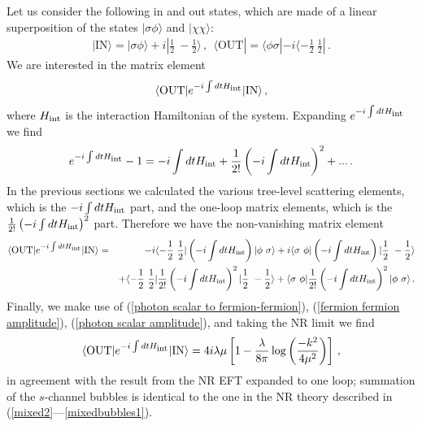 \documentclass[11pt]{article}
\begin{document}
Let us consider the following in and out states, which are made of a linear superposition of the states $|\sigma \phi \rangle$ and $|\chi\chi\rangle$:
%
\begin{eqnarray}
\nonumber
|\mbox{IN}\rangle  = |\sigma \phi \rangle +i|\frac{1}{2}~-\frac{1}{2}\rangle\,,  ~~
\langle\mbox{OUT}|  =   \langle  \phi \sigma|-i \langle -\frac{1}{2}~\frac{1}{2}|\,.
\end{eqnarray}
%
We are interested in the matrix element
%
\begin{eqnarray}
\langle\mbox{OUT}|e^{-i\int dt H_{\scriptsize \mbox{int}}}|\mbox{IN}\rangle\,,
\end{eqnarray}
%
where $H_{\scriptsize \mbox{int}}$ is the interaction Hamiltonian of the system. Expanding $e^{-i\int dt H_{\scriptsize \mbox{int}}}$ we find
%
\begin{eqnarray}
e^{-i\int dt H_{\scriptsize \mbox{int}}}-1=-i \int dt H_{\scriptsize \mbox{int}}+\frac{1}{2!}\left(-i \int dt H_{\scriptsize \mbox{int}}\right)^2+...\,.
\end{eqnarray}
%
In the previous sections we calculated the various tree-level scattering elements, which is the $-i \int dt H_{\scriptsize \mbox{int}}$ part, and the one-loop matrix elements, which is the $\frac{1}{2!}\left(-i \int dt H_{\scriptsize \mbox{int}}\right)^2$ part.  Therefore we have the non-vanishing matrix element
%
\begin{eqnarray}
\nonumber
\langle\mbox{OUT}|e^{-i\int dt H_{\scriptsize \mbox{int}}}|\mbox{IN}\rangle&=&-i\langle -\frac{1}{2}~\frac{1}{2}|\left( -i \int dt H_{\scriptsize \mbox{int}}\right)|\phi ~\sigma\rangle+i\langle \sigma~\phi|\left( -i \int dt H_{\scriptsize \mbox{int}}\right)| \frac{1}{2}~-\frac{1}{2}\rangle \\
\nonumber
&&+\langle -\frac{1}{2}~\frac{1}{2}|\frac{1}{2!}\left( -i \int dt H_{\scriptsize \mbox{int}}\right)^2|\frac{1}{2}~-\frac{1}{2}\rangle +\langle\sigma~\phi |\frac{1}{2!}\left( -i \int dt H_{\scriptsize \mbox{int}}\right)^2|\phi~\sigma\rangle\,.\\
\end{eqnarray}
%
Finally, we make use of (\ref{photon scalar to fermion-fermion}), (\ref{fermion fermion amplitude}), (\ref{photon scalar amplitude}), and taking the NR limit we find
%
\begin{eqnarray}
\langle\mbox{OUT}|e^{-i\int dt H_{\scriptsize\mbox{int}}}|\mbox{IN}\rangle=4i\lambda\mu\left[1-\frac{\lambda}{8\pi}\log\left(\frac{-k^2}{4\mu^2}\right)\right]\,,
\end{eqnarray}
%
 in agreement with the result from the NR EFT \label{mixedbubbles} expanded to one loop; summation of the $s$-channel bubbles is identical to the one in the NR theory described in (\ref{mixed2}---\ref{mixedbubbles1}). 






 
\end{document}
